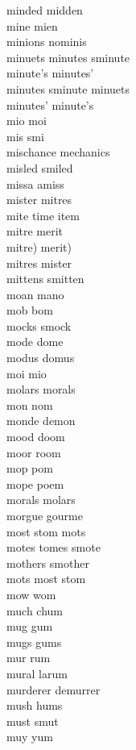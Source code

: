 minded midden\\
mine mien\\
minions nominis\\
minuets minutes sminute\\
minute's minutes'\\
minutes sminute minuets\\
minutes' minute's\\
mio moi\\
mis smi\\
mischance mechanics\\
misled smiled\\
missa amiss\\
mister mitres\\
mite time item\\
mitre merit\\
mitre) merit)\\
mitres mister\\
mittens smitten\\
moan mano\\
mob bom\\
mocks smock\\
mode dome\\
modus domus\\
moi mio\\
molars morals\\
mon nom\\
monde demon\\
mood doom\\
moor room\\
mop pom\\
mope poem\\
morals molars\\
morgue gourme\\
most stom mots\\
motes tomes smote\\
mothers smother\\
mots most stom\\
mow wom\\
much chum\\
mug gum\\
mugs gums\\
mur rum\\
mural larum\\
murderer demurrer\\
mush hums\\
must smut\\
muy yum\\

